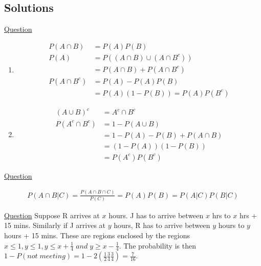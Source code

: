 \documentclass[11pt, a4paper]{article}
\begin{document}
    \subsection{Solutions}
    \begin{enumerate}
        \item \hypertarget{a_indcomp}{\hyperlink{q_indcomp}{Question}}
        \begin{enumerate}
            \item 
            \begin{align*}
                P(A \cap B) &= P(A) P(B)\\
                P(A) &= P((A \cap B) \cup (A \cap B^{c}))\\
                    &= P(A \cap B) + P(A \cap B^{c}) \tag*{since disjoint}\\
                P(A \cap B^{c}) &= P(A) - P(A)P(B)\\
                    &= P(A)(1 - P(B)) = P(A)P(B^{c})
            \end{align*}
            \item 
            \begin{align*}
                (A \cup B)^{c} &= A^{c} \cap B^{c}\\
                P(A^{c} \cap B^{c}) &= 1 - P(A \cup B)\\
                                &= 1 - P(A) - P(B) + P(A \cap B)\\
                                &= (1 - P(A))(1 - P(B))\\
                                &= P(A^{c})P(B^{c})
            \end{align*}
        \end{enumerate}

        \item \hypertarget{a_conind}{\hyperlink{q_conind}{Question}}
        \begin{align*}
            P(A \cap B | C) = \frac{P(A \cap B \cap C)}{P(C)} = P(A)P(B) = P(A|C)P(B|C) \tag*{Due to independence}
        \end{align*}

        \hypertarget{a_geomeet}{\item} \hyperlink{q_geomeet}{Question} \newline
        Suppose R arrives at $x$ hours. J has to arrive between $x$ hrs to $x$ hrs + 15 mins. Similarly if J arrives at $y$ hours, R has to arrive between $y$ hours to $y$ hours + 15 mins. These are regions enclosed by the regions $x \leq 1, y \leq 1, y \leq x + \frac{1}{4} \;and\; y \geq x - \frac{1}{4}$. The probability is then $ 1 - P(not\;meeting) = 1 - 2(\frac{1}{2} \frac{3}{4} \frac{3}{4}) = \frac{7}{16}$.
    

\end{enumerate}
\end{document}
